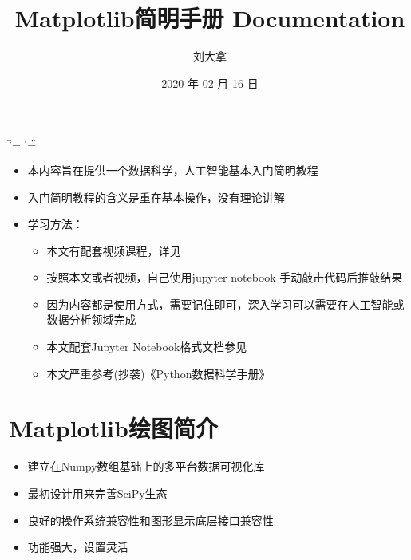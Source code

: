 \documentclass[letterpaper,10pt,english]{sphinxhowto}
\title{Matplotlib简明手册 Documentation}
\date{2020 年 02 月 16 日}
\author{刘大拿}
\begin{document}
\ifdefined\shorthandoff
  \ifnum\catcode`\=\string=\active\shorthandoff{=}\fi
  \ifnum\catcode`\"=\active{}\fi
\fi
\maketitle
\sphinxtableofcontents
{}\label{\detokenize{index::doc}}

\begin{itemize}
\item {} 
本内容旨在提供一个数据科学，人工智能基本入门简明教程

\item {} 
入门简明教程的含义是重在基本操作，没有理论讲解

\item {} 
学习方法：
\begin{itemize}
\item {} 
本文有配套视频课程，详见

\item {} 
按照本文或者视频，自己使用jupyter notebook 手动敲击代码后推敲结果

\item {} 
因为内容都是使用方式，需要记住即可，深入学习可以需要在人工智能或数据分析领域完成

\item {} 
本文配套Jupyter Notebook格式文档参见

\item {} 
本文严重参考(抄袭)《Python数据科学手册》

\end{itemize}

\end{itemize}


\section{Matplotlib绘图简介}
\label{\detokenize{matplotlib_u7b80_u4ecb:matplotlib}}\label{\detokenize{matplotlib_u7b80_u4ecb::doc}}\begin{itemize}
\item {} 
建立在Numpy数组基础上的多平台数据可视化库

\item {} 
最初设计用来完善SciPy生态

\item {} 
良好的操作系统兼容性和图形显示底层接口兼容性

\item {} 
功能强大，设置灵活

\end{itemize}
\end{document}
